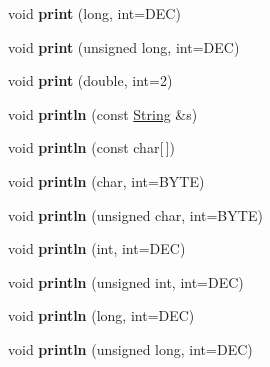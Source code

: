 \begin{DoxyCompactItemize}
\item 
\hypertarget{classPrint_afab3f8d07a58a8d37fec32d7fcb67b56}{
void {\bfseries print} (long, int=\-D\-E\-C)}
\label{classPrint_afab3f8d07a58a8d37fec32d7fcb67b56}

\item 
\hypertarget{classPrint_a4be58e920bdddcaf5496d0ba2ae4ea81}{
void {\bfseries print} (unsigned long, int=\-D\-E\-C)}
\label{classPrint_a4be58e920bdddcaf5496d0ba2ae4ea81}

\item 
\hypertarget{classPrint_aa5fe80d3a3e8d2dc64f346eb08dcb43f}{
void {\bfseries print} (double, int=2)}
\label{classPrint_aa5fe80d3a3e8d2dc64f346eb08dcb43f}

\item 
\hypertarget{classPrint_abeb8bc6c2d103469679b88c1a966a21f}{
void {\bfseries println} (const \hyperlink{classString}{\-String} \&s)}
\label{classPrint_abeb8bc6c2d103469679b88c1a966a21f}

\item 
\hypertarget{classPrint_a09db74a8d51c6b2420c478267f958a51}{
void {\bfseries println} (const char\mbox{[}$\,$\mbox{]})}
\label{classPrint_a09db74a8d51c6b2420c478267f958a51}

\item 
\hypertarget{classPrint_a49bbefc9016ddda486edf3dddaaa07e9}{
void {\bfseries println} (char, int=\-B\-Y\-T\-E)}
\label{classPrint_a49bbefc9016ddda486edf3dddaaa07e9}

\item 
\hypertarget{classPrint_a4eaaf09c278a5927ba2ddcffb6b01e64}{
void {\bfseries println} (unsigned char, int=\-B\-Y\-T\-E)}
\label{classPrint_a4eaaf09c278a5927ba2ddcffb6b01e64}

\item 
\hypertarget{classPrint_a350bdfe3569acb05a2fdefb7c54e292d}{
void {\bfseries println} (int, int=\-D\-E\-C)}
\label{classPrint_a350bdfe3569acb05a2fdefb7c54e292d}

\item 
\hypertarget{classPrint_af0aeb581689c6e9c9f8331b342a91e20}{
void {\bfseries println} (unsigned int, int=\-D\-E\-C)}
\label{classPrint_af0aeb581689c6e9c9f8331b342a91e20}

\item 
\hypertarget{classPrint_a1999020b07369721caa16c52fdba4341}{
void {\bfseries println} (long, int=\-D\-E\-C)}
\label{classPrint_a1999020b07369721caa16c52fdba4341}

\item 
\hypertarget{classPrint_aacf64fb9630526fb6c666f038a9dc4e6}{
void {\bfseries println} (unsigned long, int=\-D\-E\-C)}
\label{classPrint_aacf64fb9630526fb6c666f038a9dc4e6}


\end{DoxyCompactItemize}
